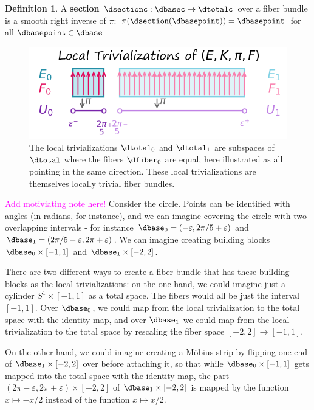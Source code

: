 \documentclass[journal]{IEEEtran}
\newcommand{\note}[1]{\textcolor{magenta}{#1}}
\theoremstyle{definition}
\newtheorem{definition}{Definition}[section]
\theoremstyle{remark}
\begin{document}
\begin{definition} A \textcolor{section}{\textbf{section}} $\dsectionc: \dbasec \rightarrow \dtotalc$ over a fiber bundle is a smooth right inverse of $\pi$: $\pi(\dsection(\dbasepoint)) = \dbasepoint$ for all $\dbasepoint \in \dbase$
\end{definition}

\begin{figure}[H]
  \includegraphics[width=\columnwidth]{figures/local_trivalizations.png}
  \caption{The local trivializations $\dtotal_{0}$ and $\dtotal_{1}$ are subspaces of $\dtotal$ where the fibers $\dfiber_{0}$ are equal, here illustrated as all pointing in the same direction. These local trivializations are themselves locally trivial fiber bundles.} 
  \label{fig:atct:local_trivalizations}
\end{figure}

\note{Add motiviating note here!}
Consider the circle. Points can be identified with angles (in radians, for instance), and we can imagine covering the circle with two overlapping intervals - for instance $\dbase_0=(-\varepsilon, 2\pi/5+\varepsilon)$ and $\dbase_1=(2\pi/5-\varepsilon, 2\pi+\varepsilon)$. We can imagine creating building blocks $\dbase_0\times[-1,1]$ and $\dbase_1\times[-2,2]$.

There are two different ways to create a fiber bundle that has these building blocks as the local trivializations: on the one hand, we could imagine just a cylinder $S^1\times[-1,1]$ as a total space. The fibers would all be just the interval $[-1,1]$. Over $\dbase_0$, we could map from the local trivialization to the total space with the identity map, and over $\dbase_1$ we could map from the local trivialization to the total space by rescaling the fiber space $[-2,2]\to[-1,1]$.

On the other hand, we could imagine creating a Möbius strip by flipping one end of $\dbase_1\times[-2,2]$ over before attaching it, so that while $\dbase_0\times[-1,1]$ gets mapped into the total space with the identity map, the part $(2\pi-\varepsilon,2\pi+\varepsilon)\times[-2,2]$ of $\dbase_1\times[-2,2]$ is mapped by the function $x\mapsto -x/2$ instead of the function $x\mapsto x/2$.
\end{document}

